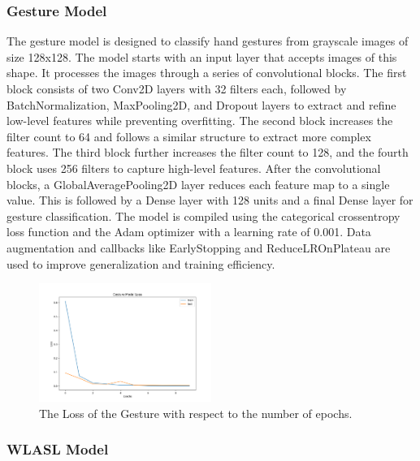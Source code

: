 \documentclass{article}
\begin{document}
\subsubsection{Gesture Model}
The gesture model is designed to classify hand gestures from grayscale images of size 128x128. The model starts with an input layer that accepts images of this shape. It processes the images through a series of convolutional blocks. The first block consists of two Conv2D layers with 32 filters each, followed by BatchNormalization, MaxPooling2D, and Dropout layers to extract and refine low-level features while preventing overfitting. The second block increases the filter count to 64 and follows a similar structure to extract more complex features. The third block further increases the filter count to 128, and the fourth block uses 256 filters to capture high-level features. After the convolutional blocks, a GlobalAveragePooling2D layer reduces each feature map to a single value. This is followed by a Dense layer with 128 units and a final Dense layer for gesture classification. The model is compiled using the categorical crossentropy loss function and the Adam optimizer with a learning rate of 0.001. Data augmentation and callbacks like EarlyStopping and ReduceLROnPlateau are used to improve generalization and training efficiency.


\begin{figure}[t]
	\centering
	\includegraphics[width=0.5\textwidth]{figures/gesture-model.png} %
	\caption{The Loss of the Gesture with respect to the number of epochs.}
	\label{fig:gesture-model} %
\end{figure}

\subsubsection{WLASL Model}
\end{document}
